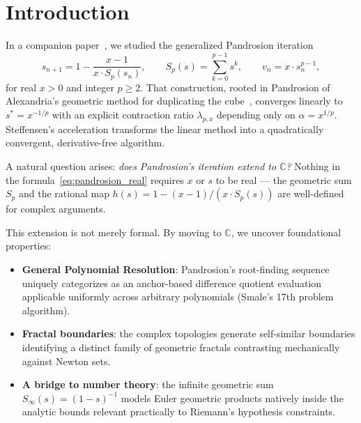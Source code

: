 \documentclass[10pt,a4paper,oneside]{book}
\theoremstyle{definition}
\theoremstyle{remark}
\newcommand{\CC}{\mathbb{C}}
\begin{document}
\bigskip

\section{Introduction}

In a companion paper~\cite{besevic2026}, we studied the generalized Pandrosion iteration
\begin{equation}
  \label{eq:pandrosion_real}
  s_{n+1} = 1 - \frac{x-1}{x \cdot S_p(s_n)},
  \qquad
  S_p(s) = \sum_{k=0}^{p-1} s^k,
  \qquad
  v_n = x \cdot s_n^{p-1},
\end{equation}
for real $x > 0$ and integer $p \geq 2$.  That construction, rooted in Pandrosion of Alexandria's geometric method for duplicating the cube~\cite{pappus}, converges linearly to $s^* = x^{-1/p}$ with an explicit contraction ratio $\lambda_{p,x}$ depending only on $\alpha = x^{1/p}$.  Steffensen's acceleration transforms the linear method into a quadratically convergent, derivative-free algorithm.

\medskip

A natural question arises: \emph{does Pandrosion's iteration extend to $\CC$?}  Nothing in the formula~\eqref{eq:pandrosion_real} requires $x$ or $s$ to be real --- the geometric sum $S_p$ and the rational map $h(s) = 1 - (x-1)/(x \cdot S_p(s))$ are well-defined for complex arguments.

\medskip

This extension is not merely formal. By moving to $\CC$, we uncover foundational properties:
\begin{itemize}
  \item \textbf{General Polynomial Resolution}: Pandrosion's root-finding sequence uniquely categorizes as an anchor-based difference quotient evaluation applicable uniformly across arbitrary polynomials (Smale's 17th problem algorithm).
  \item \textbf{Fractal boundaries}: the complex topologies generate self-similar boundaries identifying a distinct family of geometric fractals contrasting mechanically against Newton sets.
  \item \textbf{A bridge to number theory}: the infinite geometric sum $S_\infty(s) = (1-s)^{-1}$ models Euler geometric products natively inside the analytic bounds relevant practically to Riemann's hypothesis constraints.
\end{itemize}
\end{document}
